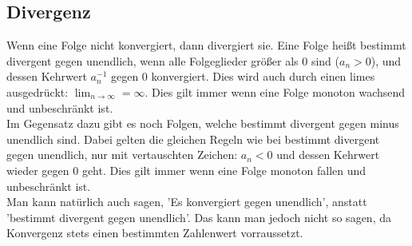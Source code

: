 \documentclass{article}
\begin{document}
	\subsection{Divergenz}
	Wenn eine Folge nicht konvergiert, dann divergiert sie. Eine Folge heißt bestimmt divergent gegen unendlich, wenn alle Folgeglieder größer als 0 sind ($a_n>0$), und dessen Kehrwert $a_n^{-1}$ gegen 0 konvergiert. Dies wird auch durch einen limes ausgedrückt: $\lim_{n\to\infty}=\infty$. Dies gilt immer wenn eine Folge monoton wachsend und unbeschränkt ist. \\
	Im Gegensatz dazu gibt es noch Folgen, welche bestimmt divergent gegen minus unendlich sind. Dabei gelten die gleichen Regeln wie bei bestimmt divergent gegen unendlich, nur mit vertauschten Zeichen: $a_n<0$ und dessen Kehrwert wieder gegen 0 geht. Dies gilt immer wenn eine Folge monoton fallen und unbeschränkt ist. \\
	Man kann natürlich auch sagen, 'Es konvergiert gegen unendlich', anstatt 'bestimmt divergent gegen unendlich'. Das kann man jedoch nicht so sagen, da Konvergenz stets einen bestimmten Zahlenwert vorraussetzt.
\end{document}
